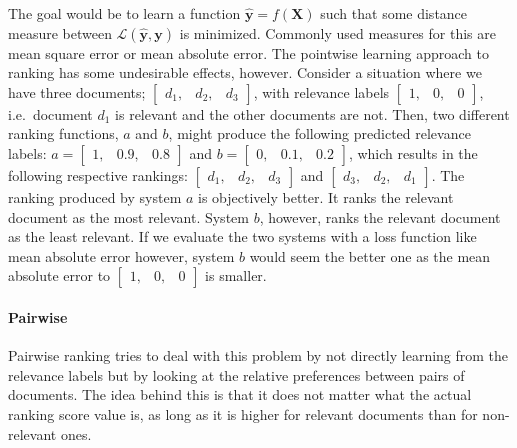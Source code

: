 The goal would be to learn a function $\mathbf{\hat y} = f(\mathbf{X})$ such that some distance measure between $\mathcal{L}\left(\mathbf{\hat y}, \mathbf{y} \right)$ is minimized. Commonly used measures for this are mean square error or mean absolute error. The pointwise learning approach to ranking has some undesirable effects, however. Consider a situation where we have three documents; 
$\left[
\begin{smallmatrix}
	d_1, & d_2, & d_3
\end{smallmatrix}
\right]$, with relevance labels
$\left[
\begin{smallmatrix}
	1, & 0, & 0
\end{smallmatrix}
\right]$, i.e.\ document $d_1$ is relevant and the other documents are not. Then, two different ranking functions, $a$ and $b$, might produce the following predicted relevance labels: 
$a = \left[
\begin{smallmatrix}
	1, & 0.9, & 0.8
\end{smallmatrix}
\right]$ 
and
$b = \left[
\begin{smallmatrix}
	0, & 0.1, & 0.2
\end{smallmatrix}
\right]$, which results in the following respective rankings:
$\left[
\begin{smallmatrix}
	d_1, & d_2, & d_3
\end{smallmatrix}
\right]$ 
and 
$\left[
\begin{smallmatrix}
	d_3, & d_2, & d_1
\end{smallmatrix}
\right]$. 
The ranking produced by system $a$ is objectively better. It ranks the relevant document as the most relevant. System $b$, however, ranks the relevant document as the least relevant. If we evaluate the two systems with a loss function like mean absolute error however, system $b$ would seem the better one as the mean absolute error to
$\left[
\begin{smallmatrix}
	1, & 0, & 0
\end{smallmatrix}
\right]$
is smaller. 

\paragraph{Pairwise} Pairwise ranking tries to deal with this problem by not directly learning from the relevance labels but by looking at the relative preferences between pairs of documents. The idea behind this is that it does not matter what the actual ranking score value is, as long as it is higher for relevant documents than for non-relevant ones.  

